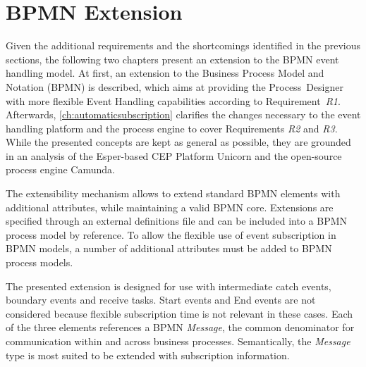 \section{BPMN Extension}\label{ch:bpmnx}


Given the additional requirements and the shortcomings identified in the previous sections, the following two chapters present an extension to the BPMN event handling model.
At first, an extension to the Business Process Model and Notation (BPMN) is described, which aims at providing the Process~Designer with more flexible Event Handling capabilities according to Requirement~\textit{R1}.
Afterwards, \autoref{ch:automaticsubscription} clarifies the changes necessary to the event handling platform and the process engine to cover Requirements \textit{R2} and \textit{R3}.
While the presented concepts are kept as general as possible, they are grounded in an analysis of the Esper-based CEP Platform Unicorn and the open-source process engine Camunda.

The extensibility mechanism allows to extend standard BPMN elements with additional attributes, while maintaining a valid BPMN core.
Extensions are specified through an external definitions file and can be included into a BPMN process model by reference.
To allow the flexible use of event subscription in BPMN models, a number of additional attributes must be added to BPMN process models.

The presented extension is designed for use with intermediate catch events, boundary events and receive tasks. Start events and End events are not considered because flexible subscription time is not relevant in these cases.
Each of the three elements references a BPMN \textit{Message}, the common denominator for communication within and across business processes.
Semantically, the \textit{Message} type is most suited to be extended with subscription information.




